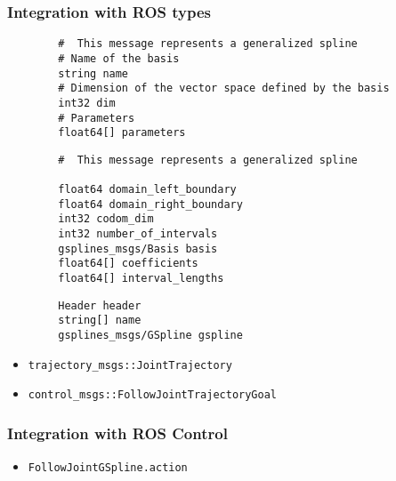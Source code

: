 \begin{frame}[fragile]
	\frametitle{Integration with ROS types}
	\begin{lstlisting}
        #  This message represents a generalized spline
        # Name of the basis
        string name
        # Dimension of the vector space defined by the basis
        int32 dim
        # Parameters
        float64[] parameters
	\end{lstlisting}
	\begin{lstlisting}
        #  This message represents a generalized spline

        float64 domain_left_boundary
        float64 domain_right_boundary
        int32 codom_dim
        int32 number_of_intervals
        gsplines_msgs/Basis basis
        float64[] coefficients
        float64[] interval_lengths
	\end{lstlisting}
	\begin{lstlisting}
        Header header
        string[] name
        gsplines_msgs/GSpline gspline
	\end{lstlisting}
	\begin{itemize}
		\item \Verb|trajectory_msgs::JointTrajectory|
		\item \Verb|control_msgs::FollowJointTrajectoryGoal|

	\end{itemize}
\end{frame}

\begin{frame}[fragile]
	\frametitle{Integration with ROS Control}
	\begin{itemize}
		\item \Verb|FollowJointGSpline.action|
	\end{itemize}

	\begin{center}
	\end{center}

\end{frame}

